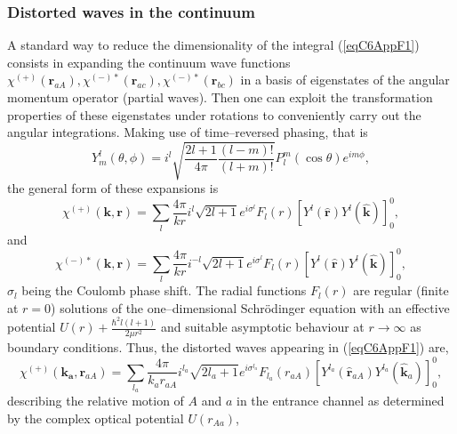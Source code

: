 \begin{subappendices}
\subsubsection{Distorted waves in the continuum}
A standard way to reduce the dimensionality of the integral (\ref{eqC6AppF1}) consists in expanding the continuum wave functions $\chi^{(+)}(\mathbf{r}_{aA}),\chi^{(-)*}(\mathbf{r}_{ac}),\chi^{(-)*}(\mathbf{r}_{bc})$ in a basis of eigenstates of the angular momentum operator (partial waves). Then one can exploit the transformation properties of these eigenstates under rotations to conveniently carry out the angular integrations. Making use of time--reversed phasing, that is
\begin{equation}\label{eq6G3}
Y_m^l(\theta,\phi)=i^l \sqrt{\frac{2l+1}{4\pi}\frac{(l-m)!}{(l+m)!}}P_l^m(\cos \theta)e^{im\phi},
\end{equation}
 the general form of these expansions is
 \begin{equation}\label{eqC6AppF2}
\chi^{(+)}(\mathbf{k},\mathbf{r})= \sum_{l}\frac{4\pi}{k r} i^{l}\sqrt{2l+1}
e^{i\sigma^{l}} F_{l}(r) \left[ Y^{l} (\hat {\mathbf{r}}) Y^{l} (\hat {\mathbf{k}})\right]^0_0,
\end{equation}
and
 \begin{equation}\label{eqC6AppF3}
\chi^{(-)*}(\mathbf{k},\mathbf{r})= \sum_{l}\frac{4\pi}{k r} i^{-l}\sqrt{2l+1}
e^{i\sigma^{l}} F_{l}(r) \left[ Y^{l} (\hat {\mathbf{r}}) Y^{l} (\hat {\mathbf{k}})\right]^0_0,
\end{equation}
$\sigma_l$ being the Coulomb phase shift. The radial functions $F_{l}(r)$ are regular (finite at $r=0$) solutions of the one--dimensional Schr\"{o}dinger equation with an effective potential $U(r)+\tfrac{\hbar^2 l(l+1)}{2\mu r^2}$ and suitable asymptotic behaviour at $r\rightarrow\infty$ as boundary conditions. 
Thus, the distorted waves appearing in (\ref{eqC6AppF1}) are,
 \begin{equation}\label{eq4}
\chi^{(+)}(\mathbf{k_{a}},\mathbf{r}_{aA})= \sum_{l_a}\frac{4\pi}{k_a r_{aA}} i^{l_a}\sqrt{2l_a+1}
e^{i\sigma^{l_a}} F_{l_a}(r_{aA}) \left[ Y^{l_a} (\hat{\mathbf r}_{aA}) Y^{l_a} (\hat{ \mathbf k}_{a})\right]^0_0,
\end{equation}
describing the relative motion of $A$ and $a$ in the entrance channel as determined by  the complex optical potential $U(r_{Aa})$,
 \begin{figure}

\end{figure}
\end{subappendices}
